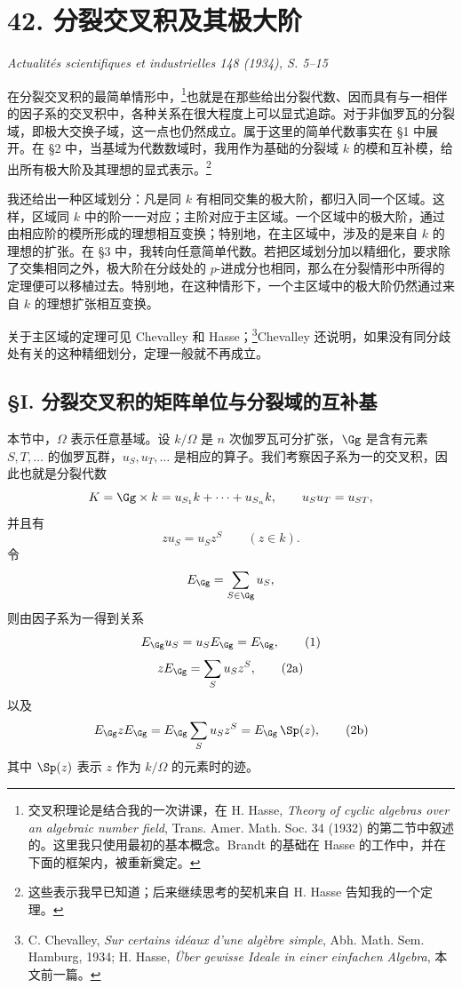 \section*{42. 分裂交叉积及其极大阶}

\begin{center}
\emph{Actualités scientifiques et industrielles 148 (1934), S. 5--15}
\end{center}

在分裂交叉积的最简单情形中，\footnote{交叉积理论是结合我的一次讲课，在 H. Hasse, \emph{Theory of cyclic algebras over an algebraic number field}, Trans. Amer. Math. Soc. 34 (1932) 的第二节中叙述的。这里我只使用最初的基本概念。Brandt 的基础在 Hasse 的工作中，并在下面的框架内，被重新奠定。}也就是在那些给出分裂代数、因而具有与一相伴的因子系的交叉积中，各种关系在很大程度上可以显式追踪。对于非伽罗瓦的分裂域，即极大交换子域，这一点也仍然成立。属于这里的简单代数事实在 §1 中展开。在 §2 中，当基域为代数数域时，我用作为基础的分裂域 \(k\) 的模和互补模，给出所有极大阶及其理想的显式表示。\footnote{这些表示我早已知道；后来继续思考的契机来自 H. Hasse 告知我的一个定理。}

我还给出一种区域划分：凡是同 \(k\) 有相同交集的极大阶，都归入同一个区域。这样，区域同 \(k\) 中的阶一一对应；主阶对应于主区域。一个区域中的极大阶，通过由相应阶的模所形成的理想相互变换；特别地，在主区域中，涉及的是来自 \(k\) 的理想的扩张。在 §3 中，我转向任意简单代数。若把区域划分加以精细化，要求除了交集相同之外，极大阶在分歧处的 \(p\)-进成分也相同，那么在分裂情形中所得的定理便可以移植过去。特别地，在这种情形下，一个主区域中的极大阶仍然通过来自 \(k\) 的理想扩张相互变换。

关于主区域的定理可见 Chevalley 和 Hasse；\footnote{C. Chevalley, \emph{Sur certains idéaux d'une algèbre simple}, Abh. Math. Sem. Hamburg, 1934; H. Hasse, \emph{Über gewisse Ideale in einer einfachen Algebra}, 本文前一篇。}Chevalley 还说明，如果没有同分歧处有关的这种精细划分，定理一般就不再成立。

\subsection*{§I. 分裂交叉积的矩阵单位与分裂域的互补基}

本节中，\(\Omega\) 表示任意基域。设 \(k/\Omega\) 是 \(n\) 次伽罗瓦可分扩张，\(\Gg\) 是含有元素 \(S,T,\ldots\) 的伽罗瓦群，\(u_S,u_T,\ldots\) 是相应的算子。我们考察因子系为一的交叉积，因此也就是分裂代数
\[
        K=\Gg\times k=u_{S_1}k+\cdots+u_{S_n}k,\qquad
        u_Su_T=u_{ST},
\]
并且有
\[
        z u_S=u_S z^S \qquad(z\in k).
\]
令
\[
        E_\Gg=\sum_{S\in\Gg}u_S,
\]
则由因子系为一得到关系
\[
        E_\Gg u_S=u_S E_\Gg=E_\Gg,                            \tag{1}
\]
\[
        zE_\Gg=\sum_Su_Sz^S,                                  \tag{2a}
\]
以及
\[
        E_\Gg z E_\Gg
        =E_\Gg\sum_Su_Sz^S
        =E_\Gg\,\Sp(z),                                      \tag{2b}
\]
其中 \(\Sp(z)\) 表示 \(z\) 作为 \(k/\Omega\) 的元素时的迹。

